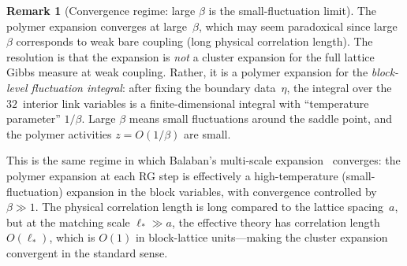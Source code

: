\documentclass[11pt]{article}
\theoremstyle{definition}
\newtheorem{remark}[theorem]{Remark}
\begin{document}
\begin{remark}[Convergence regime: large $\beta$ is the
small-fluctuation limit]\label{rem:convergence-regime}
The polymer expansion converges at large~$\beta$, which may
seem paradoxical since large $\beta$ corresponds to weak
bare coupling (long physical correlation length).  The
resolution is that the expansion is \emph{not} a cluster
expansion for the full lattice Gibbs measure at weak coupling.
Rather, it is a polymer expansion for the \emph{block-level
fluctuation integral}: after fixing the boundary data~$\eta$,
the integral over the $32$~interior link variables is a
finite-dimensional integral with ``temperature parameter''
$1/\beta$.  Large $\beta$ means small fluctuations around
the saddle point, and the polymer activities
$z=O(1/\beta)$ are small.

This is the same regime in which Balaban's multi-scale
expansion~\cite{BalabanI,BalabanII} converges: the polymer
expansion at each RG step is effectively a high-temperature
(small-fluctuation) expansion in the block variables, with
convergence controlled by $\beta\gg 1$.  The physical
correlation length is long compared to the lattice spacing~$a$,
but at the matching scale $\ell_*\gg a$, the effective
theory has correlation length $O(\ell_*)$, which is $O(1)$
in block-lattice units---making the cluster expansion
convergent in the standard sense.
\end{remark}
\end{document}
